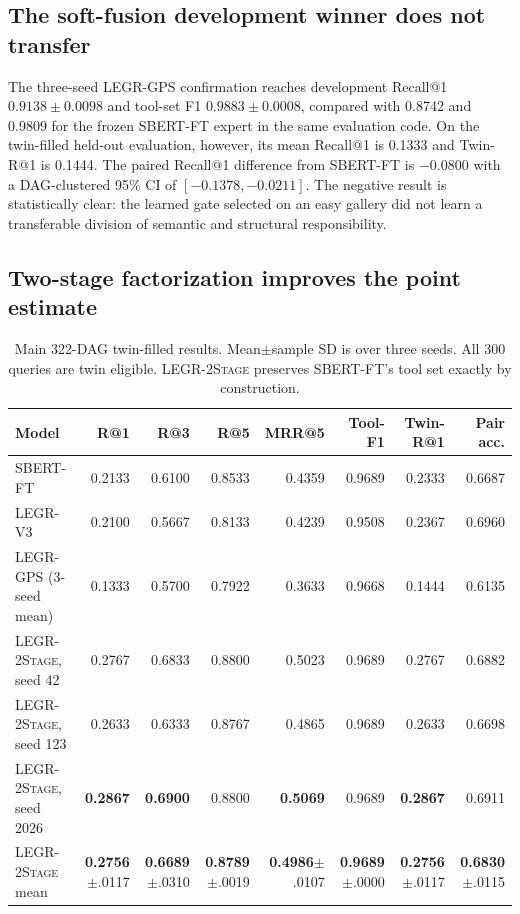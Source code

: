 \documentclass{article}
\makeatletter
\newcommand{\method}{\textsc{LEGR-2Stage}}
\newcommand{\sbert}{\textsc{SBERT-FT}}
\newcommand{\vthree}{\textsc{LEGR-V3}}
\newcommand{\gps}{\textsc{LEGR-GPS}}
\newcommand{\Rone}{R@1}
\newcommand{\Rthree}{R@3}
\newcommand{\Rfive}{R@5}
\newcommand{\toolF}{Tool-F1}
\newcommand{\twR}{Twin-R@1}
\makeatother
\begin{document}
\subsection{The soft-fusion development winner does not transfer}

The three-seed \gps{} confirmation reaches development Recall@1 $0.9138\pm0.0098$ and tool-set F1 $0.9883\pm0.0008$, compared with 0.8742 and 0.9809 for the frozen \sbert{} expert in the same evaluation code.
On the twin-filled held-out evaluation, however, its mean Recall@1 is 0.1333 and Twin-R@1 is 0.1444.
The paired Recall@1 difference from \sbert{} is $-0.0800$ with a DAG-clustered 95\% CI of $[-0.1378,-0.0211]$.
The negative result is statistically clear: the learned gate selected on an easy gallery did not learn a transferable division of semantic and structural responsibility.

\subsection{Two-stage factorization improves the point estimate}

\begin{table}[t]
\caption{Main 322-DAG twin-filled results.  Mean$\pm$sample SD is over three seeds.  All 300 queries are twin eligible.  \method{} preserves \sbert{}'s tool set exactly by construction.}
\label{tab:main}
\centering
\small
\begin{tabular}{lrrrrrrr}
\toprule
Model & \Rone{} & \Rthree{} & \Rfive{} & MRR@5 & \toolF{} & \twR{} & Pair acc. \\
\midrule
\sbert{} & 0.2133 & 0.6100 & 0.8533 & 0.4359 & 0.9689 & 0.2333 & 0.6687 \\
\vthree{} & 0.2100 & 0.5667 & 0.8133 & 0.4239 & 0.9508 & 0.2367 & 0.6960 \\
\gps{} (3-seed mean) & 0.1333 & 0.5700 & 0.7922 & 0.3633 & 0.9668 & 0.1444 & 0.6135 \\
\midrule
\method{}, seed 42 & 0.2767 & 0.6833 & 0.8800 & 0.5023 & 0.9689 & 0.2767 & 0.6882 \\
\method{}, seed 123 & 0.2633 & 0.6333 & 0.8767 & 0.4865 & 0.9689 & 0.2633 & 0.6698 \\
\method{}, seed 2026 & \textbf{0.2867} & \textbf{0.6900} & 0.8800 & \textbf{0.5069} & 0.9689 & \textbf{0.2867} & 0.6911 \\
\method{} mean & \textbf{0.2756}$\pm$.0117 & \textbf{0.6689}$\pm$.0310 & \textbf{0.8789}$\pm$.0019 & \textbf{0.4986}$\pm$.0107 & \textbf{0.9689}$\pm$.0000 & \textbf{0.2756}$\pm$.0117 & \textbf{0.6830}$\pm$.0115 \\
\bottomrule
\end{tabular}
\end{table}
\end{document}

